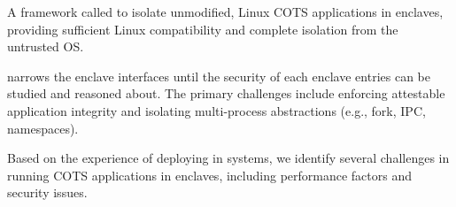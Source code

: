 \begin{compactitem}

\item A framework called \graphenesgx{} to isolate unmodified, Linux COTS applications in enclaves,
providing sufficient Linux compatibility and complete isolation from the untrusted OS.

\item \graphenesgx{} narrows the enclave interfaces until the security of each enclave entries can be studied and reasoned about.
The primary challenges include enforcing attestable application integrity and isolating multi-process abstractions (e.g., fork, IPC, namespaces).


\item Based on the experience of deploying \graphenesgx{} in systems, we identify several challenges in running COTS applications in enclaves, including performance factors and security issues.

\end{compactitem}





